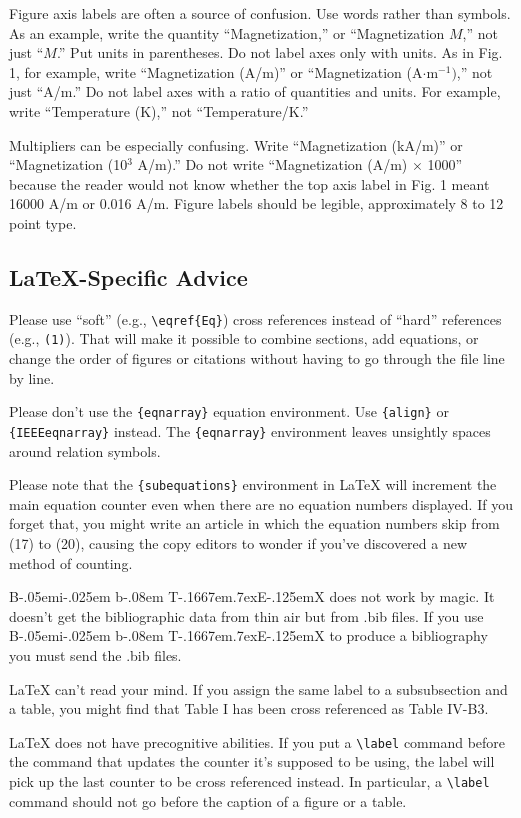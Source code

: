 \documentclass[transmag]{IEEEtran}
\def\BibTeX{{\rm B\kern-.05em{\sc i\kern-.025em b}\kern-.08em T\kern-.1667em\lower.7ex\hbox{E}\kern-.125emX}}
\begin{document}
Figure axis labels are often a source of confusion. Use words rather than 
symbols. As an example, write the quantity ``Magnetization,'' or 
``Magnetization $M$,'' not just ``$M$.'' Put units in parentheses. Do not label 
axes only with units. As in Fig. 1, for example, write ``Magnetization 
(A/m)'' or ``Magnetization (A$\cdot $m$^{-1})$,'' not just ``A/m.'' Do not 
label axes with a ratio of quantities and units. For example, write 
``Temperature (K),'' not ``Temperature/K.'' 

Multipliers can be especially confusing. Write ``Magnetization (kA/m)'' or 
``Magnetization (10$^{3}$ A/m).'' Do not write ``Magnetization (A/m) 
$\times$ 1000'' because the reader would not know whether the top axis 
label in Fig. 1 meant 16000 A/m or 0.016 A/m. Figure labels should be 
legible, approximately 8 to 12 point type.

\subsection{\LaTeX-Specific Advice}

Please use ``soft'' (e.g., \verb|\eqref{Eq}|) cross references instead
of ``hard'' references (e.g., \verb|(1)|). That will make it possible
to combine sections, add equations, or change the order of figures or
citations without having to go through the file line by line.

Please don't use the \verb|{eqnarray}| equation environment. Use
\verb|{align}| or \verb|{IEEEeqnarray}| instead. The \verb|{eqnarray}|
environment leaves unsightly spaces around relation symbols.

Please note that the \verb|{subequations}| environment in {\LaTeX}
will increment the main equation counter even when there are no
equation numbers displayed. If you forget that, you might write an
article in which the equation numbers skip from (17) to (20), causing
the copy editors to wonder if you've discovered a new method of
counting.

{\BibTeX} does not work by magic. It doesn't get the bibliographic
data from thin air but from .bib files. If you use {\BibTeX} to produce a
bibliography you must send the .bib files. 

{\LaTeX} can't read your mind. If you assign the same label to a
subsubsection and a table, you might find that Table I has been cross
referenced as Table IV-B3. 

{\LaTeX} does not have precognitive abilities. If you put a
\verb|\label| command before the command that updates the counter it's
supposed to be using, the label will pick up the last counter to be
cross referenced instead. In particular, a \verb|\label| command
should not go before the caption of a figure or a table.
\end{document}
